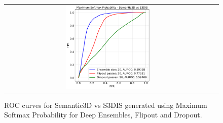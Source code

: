 \begin{figure}
\begin{tabular}{cc}
            \includegraphics[width = 0.42\textwidth, height= 0.3\textheight]{images/AUROC/MSP_20.pdf} \\
        \end{tabular}
        \caption{ROC curves for Semantic3D vs S3DIS generated using Maximum Softmax Probability for Deep Ensembles, Flipout and Dropout.}
        \label{fig:roc_msp_ood_1}
    \end{figure}
